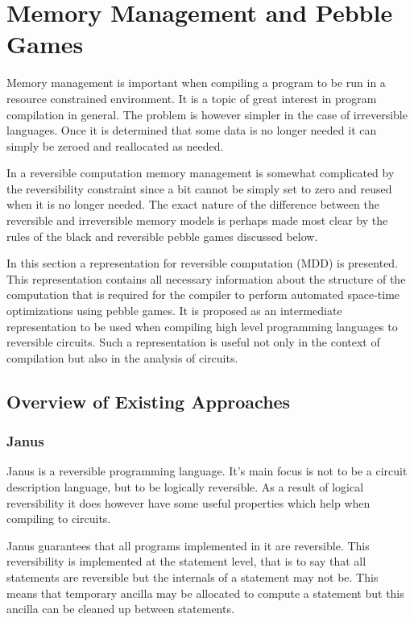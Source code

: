 \chapter{Memory Management and Pebble Games}

Memory management is important when compiling a program to be run in a resource
constrained environment. It is a topic of great interest in program compilation
in general. The problem is however simpler in the case of irreversible
languages. Once it is determined that some data is no longer needed it can
simply be zeroed and reallocated as needed.

In a reversible computation memory management is somewhat complicated by the
reversibility constraint since a bit cannot be simply set to zero and reused
when it is no longer needed. The exact nature of the difference between the
reversible and irreversible memory models is perhaps made most clear by the
rules of the black and reversible pebble games discussed below.

In this section a representation for reversible computation (MDD) is presented.
This representation contains all necessary information about the structure of
the computation that is required for the compiler to perform automated
space-time optimizations using pebble games. It is proposed as an
intermediate representation to be used when compiling high level programming
languages to reversible circuits. 
Such a representation is useful not only in the context of compilation but also in the analysis of circuits.

\section{Overview of Existing Approaches}

\subsection{Janus\label{sec:janus}} 

Janus\cite{YG:2007,LD:1982} is a reversible programming language.  It's main
focus is not to be a circuit description language, but to be logically
reversible. As a result of logical reversibility it does however have some
useful properties which help when compiling to circuits.

Janus guarantees that all programs implemented in it are reversible.
This reversibility is implemented at the statement level, that is to say that
all statements are reversible but the internals of a statement may not be.
This means that temporary ancilla may be allocated to compute a statement but
this ancilla can be cleaned up between statements.

